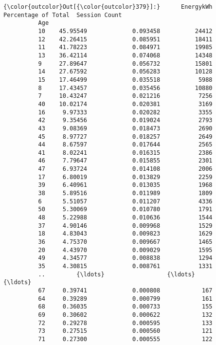 \documentclass[11pt]{article}
\begin{document}
\begin{Verbatim}[commandchars=\\\{\}]
{\color{outcolor}Out[{\color{outcolor}379}]:}      EnergykWh  Percentage of Total  Session Count
          Age                                               
          10    45.95549             0.093458          24412
          12    42.26415             0.085951          18411
          11    41.78223             0.084971          19985
          13    36.42114             0.074068          14348
          9     27.89647             0.056732          15801
          14    27.67592             0.056283          10128
          15    17.46499             0.035518           5988
          8     17.43457             0.035456          10880
          7     10.43247             0.021216           7256
          40    10.02174             0.020381           3169
          16     9.97333             0.020282           3355
          42     9.35456             0.019024           2793
          43     9.08369             0.018473           2690
          45     8.97727             0.018257           2649
          44     8.67597             0.017644           2565
          41     8.02241             0.016315           2386
          46     7.79647             0.015855           2301
          47     6.93724             0.014108           2006
          17     6.80019             0.013829           2259
          39     6.40961             0.013035           1968
          38     5.89516             0.011989           1809
          6      5.51057             0.011207           4336
          50     5.30069             0.010780           1791
          48     5.22988             0.010636           1544
          37     4.90146             0.009968           1529
          18     4.83043             0.009823           1629
          36     4.75370             0.009667           1465
          20     4.43970             0.009029           1595
          49     4.34577             0.008838           1294
          35     4.30815             0.008761           1331
          ..         {\ldots}                  {\ldots}            {\ldots}
          67     0.39741             0.000808            167
          64     0.39289             0.000799            161
          68     0.36035             0.000733            155
          69     0.30602             0.000622            132
          72     0.29278             0.000595            133
          73     0.27515             0.000560            121
          71     0.27300             0.000555            122

\end{Verbatim}
\end{document}
